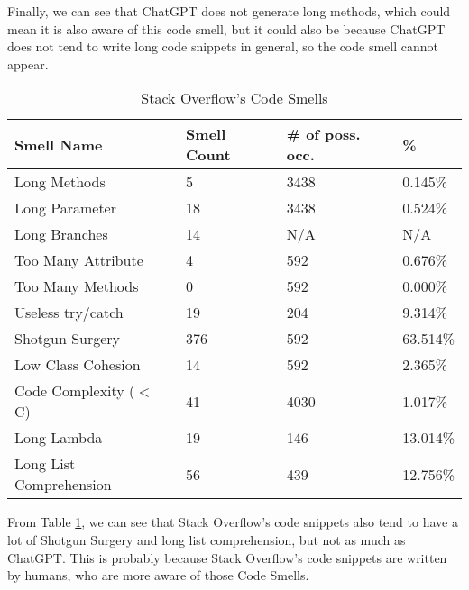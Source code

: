 Finally, we can see that ChatGPT does not generate long methods, which could mean it is also aware of this code smell, but it could also be because ChatGPT does not tend to write long code snippets in general, so the code smell cannot appear. \\

\begin{table}[!ht]
    \centering
    \caption{Stack Overflow's Code Smells}
    \begin{tabular}{llll}
        \hline
        \textbf{Smell Name}     & \textbf{Smell Count} & \textbf{\# of poss. occ.} & \textbf{\%} \\ \hline
        Long Methods            & 5                    & 3438                      & 0.145\%     \\
        Long Parameter          & 18                   & 3438                      & 0.524\%     \\
        Long Branches           & 14                   & N/A                       & N/A         \\
        Too Many Attribute      & 4                    & 592                       & 0.676\%     \\
        Too Many Methods        & 0                    & 592                       & 0.000\%     \\
        Useless try/catch       & 19                   & 204                       & 9.314\%     \\
        Shotgun Surgery         & 376                  & 592                       & 63.514\%    \\
        Low Class Cohesion      & 14                   & 592                       & 2.365\%     \\
        Code Complexity ($<$ C) & 41                   & 4030                      & 1.017\%     \\
        Long Lambda             & 19                   & 146                       & 13.014\%    \\
        Long List Comprehension & 56                   & 439                       & 12.756\%    \\ \hline
    \end{tabular}
    \label{table:result-so}
\end{table}

From Table \ref{table:result-so}, we can see that Stack Overflow's code snippets also tend to have a lot of Shotgun Surgery and long list comprehension, but not as much as ChatGPT. This is probably because Stack Overflow's code snippets are written by humans, who are more aware of those Code Smells. \\

